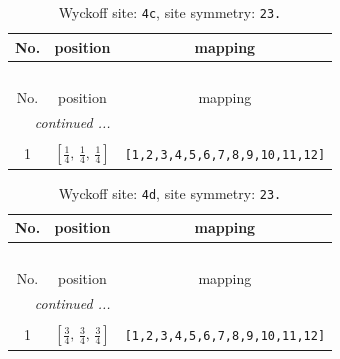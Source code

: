 \documentclass[fleqn,8pt]{jsarticle}
\begin{document}
\renewcommand{\arraystretch}{1.2}
\begin{longtable}{ccc}
\caption{Wyckoff site: {\tt 4c}, site symmetry: {\tt 23.}}
 \\
 \hline \hline
No. & position & mapping \\ \hline \endfirsthead

\multicolumn{2}{l}{\tablename\ \thetable{}} \\
 \hline \hline
No. & position & mapping \\ \hline \endhead

 \hline \hline
\multicolumn{2}{r}{\footnotesize\it continued ...} \\ \endfoot

 \hline \hline
\multicolumn{2}{r}{} \\ \endlastfoot

1 & $\left[ \frac{1}{4},\, \frac{1}{4},\, \frac{1}{4} \right]$ & {\tt [1,2,3,4,5,6,7,8,9,10,11,12]} \\
\end{longtable}
\renewcommand{\arraystretch}{1.2}
\begin{longtable}{ccc}
\caption{Wyckoff site: {\tt 4d}, site symmetry: {\tt 23.}}
 \\
 \hline \hline
No. & position & mapping \\ \hline \endfirsthead

\multicolumn{2}{l}{\tablename\ \thetable{}} \\
 \hline \hline
No. & position & mapping \\ \hline \endhead

 \hline \hline
\multicolumn{2}{r}{\footnotesize\it continued ...} \\ \endfoot

 \hline \hline
\multicolumn{2}{r}{} \\ \endlastfoot

1 & $\left[ \frac{3}{4},\, \frac{3}{4},\, \frac{3}{4} \right]$ & {\tt [1,2,3,4,5,6,7,8,9,10,11,12]} \\
\end{longtable}
\renewcommand{\arraystretch}{1.2}
\end{document}
